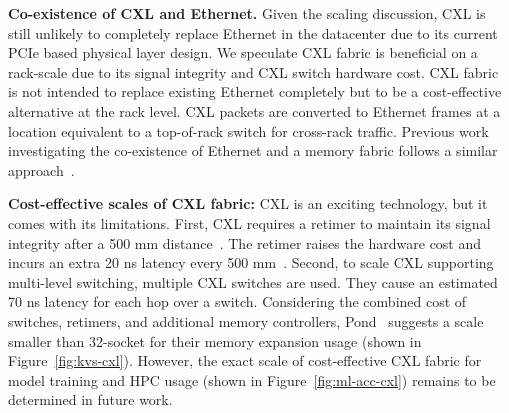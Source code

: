 \noindent \textbf{Co-existence of CXL and Ethernet.}
Given the scaling discussion, CXL is still unlikely to completely replace Ethernet in the datacenter due to its current PCIe based physical layer design. 
%
We speculate CXL fabric is beneficial on a rack-scale due to its signal integrity and CXL switch hardware cost.
%
CXL fabric is not intended to replace existing Ethernet completely but to be a cost-effective alternative at the rack level. 
%
CXL packets are converted to Ethernet frames at a location equivalent to a top-of-rack switch for cross-rack traffic.
%
Previous work investigating the co-existence of Ethernet and a memory fabric follows a similar approach~\cite{aquila:nsdi:2022}.

\noindent \textbf{Cost-effective scales of CXL fabric:}
%
CXL is an exciting technology, but it comes with its limitations.
%
First, CXL requires a retimer to maintain its signal integrity after a 500 mm distance~\cite{microchip-cxl-retimer,asteralabs-pcie-retimer}. The retimer raises the hardware cost and incurs an extra 20 ns latency every 500 mm~\cite{pond:asplos:2023}.
%
Second, to scale CXL supporting multi-level switching, multiple CXL switches are used. They cause an estimated 70 ns latency for each hop over a switch.
%
Considering the combined cost of switches, retimers, and additional memory controllers, Pond~\cite{pond-saving:ieee-micro:2023} suggests a scale smaller than 32-socket for their memory expansion usage (shown in Figure~\ref{fig:kvs-cxl}).
%
However, the exact scale of cost-effective CXL fabric for model training and HPC usage (shown in Figure~\ref{fig:ml-acc-cxl}) remains to be determined in future work.
%

%
%    

